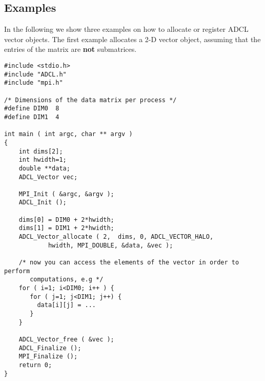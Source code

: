 \subsection{Examples}
In the following we show three examples on how to allocate or register ADCL
vector objects. The first example allocates a 2-D vector object, assuming that
the entries of the matrix are {\bf not } submatrices.

\begin{verbatim}
#include <stdio.h>
#include "ADCL.h"
#include "mpi.h"

/* Dimensions of the data matrix per process */
#define DIM0  8
#define DIM1  4

int main ( int argc, char ** argv ) 
{
    int dims[2];
    int hwidth=1;
    double **data;
    ADCL_Vector vec;
    
    MPI_Init ( &argc, &argv );
    ADCL_Init ();
    
    dims[0] = DIM0 + 2*hwidth;
    dims[1] = DIM1 + 2*hwidth;
    ADCL_Vector_allocate ( 2,  dims, 0, ADCL_VECTOR_HALO, 
            hwidth, MPI_DOUBLE, &data, &vec );
    
    /* now you can access the elements of the vector in order to perform 
       computations, e.g */
    for ( i=1; i<DIM0; i++ ) {
       for ( j=1; j<DIM1; j++) {
         data[i][j] = ...
       }
    }
    
    ADCL_Vector_free ( &vec );        
    ADCL_Finalize ();
    MPI_Finalize ();
    return 0;
}
\end{verbatim}


